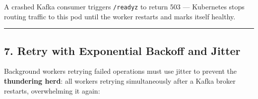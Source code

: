 \documentclass[
]{article}
\begin{document}
A crashed Kafka consumer triggers \texttt{/readyz} to return 503 ---
Kubernetes stops routing traffic to this pod until the worker restarts
and marks itself healthy.

\begin{center}\rule{0.5\linewidth}{0.5pt}\end{center}

\hypertarget{retry-with-exponential-backoff-and-jitter}{%
\subsection{7. Retry with Exponential Backoff and
Jitter}\label{retry-with-exponential-backoff-and-jitter}}

Background workers retrying failed operations must use jitter to prevent
the \textbf{thundering herd}: all workers retrying simultaneously after
a Kafka broker restarts, overwhelming it again:
\end{document}
